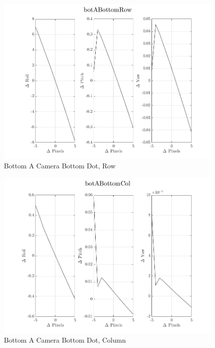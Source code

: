 \documentclass[12pt]{article}
\begin{document}
\begin{multicols}{2}
\begin{figure}[H]
	\includegraphics[width=0.9\columnwidth]{botABottomRow.png}
	\caption{Bottom A Camera Bottom Dot, Row\label{fig:botABottomRow}}
\end{figure}

\begin{figure}[H]
	\includegraphics[width=0.9\columnwidth]{botABottomCol.png}
	\caption{Bottom A Camera Bottom Dot, Column\label{fig:botABottomCol}}
\end{figure}



\end{multicols}
\end{document}
